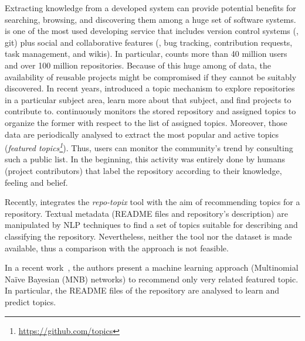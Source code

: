 
\vspace{1cm}
Extracting knowledge from a developed system can provide potential benefits for searching, browsing, and discovering them among a huge set of software systems.
\GH is one of the most used developing service that includes version control systems (\ie, git) plus social and collaborative features (\eg,  bug tracking, contribution requests, task management, and wikis).
In particular, \GH counts more than 40 million users and over 100 million repositories. Because of this huge among of data, the availability of reusable projects might be compromised if they cannot be suitably discovered. In recent years, \GH introduced a topic mechanism to explore repositories in a particular subject area, learn more about that subject, and find projects to contribute to.
\GH continuously monitors the stored repository and assigned topics to organize the former with respect to the list of assigned topics. Moreover, those data are periodically analysed to extract the most popular and active topics (\ie \emph{featured topics\footnote{\url{https://github.com/topics}}}). Thus, users can monitor the community’s trend by consulting such a public list. In the beginning, this activity was entirely done by humans (\ie project contributors) that label the repository according to their knowledge, feeling and belief.

Recently, \GH integrates the \emph{repo-topix} tool with the aim of recommending topics for a \GH repository. Textual metadata (\ie README files and repository's description) are manipulated by NLP techniques to find a set of topics suitable for describing and classifying the repository. 
Nevertheless, neither the tool nor the dataset is made available,
thus a comparison with the approach is not feasible.

In a recent work~\cite{10.1145/3383219.3383227}, the authors present a machine learning approach (\ie Multinomial Na\"{i}ve Bayesian (MNB) networks) to recommend only very related featured topic. In particular, the README files of the repository are analysed to learn and predict \GH topics.

